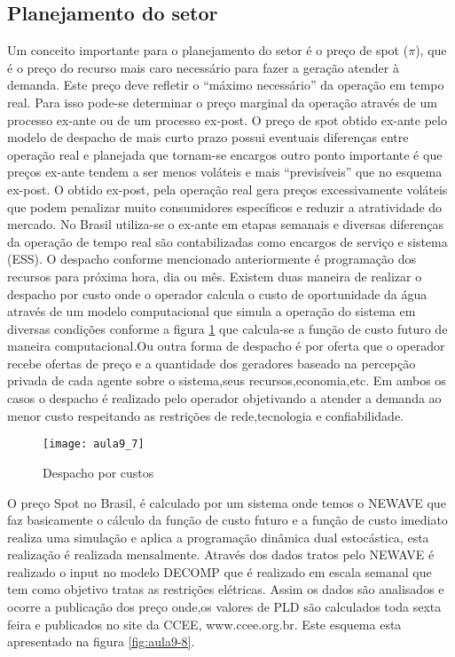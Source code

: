 \subsection{Planejamento do setor}
  Um conceito importante para o planejamento do setor é o preço de spot ($\pi$), que é o preço do recurso mais caro necessário para fazer a geração atender à demanda. Este preço deve refletir o ``máximo necessário'' da operação em tempo real. Para isso pode-se determinar o preço marginal da operação através de um processo ex-ante ou de um processo ex-post. O preço de spot obtido ex-ante pelo modelo de despacho de mais curto prazo possui eventuais diferenças entre operação real e planejada que tornam-se encargos outro ponto importante é que preços ex-ante tendem a ser menos voláteis e mais ``previsíveis'' que no esquema ex-post. O obtido ex-post, pela operação real gera preços excessivamente voláteis que podem penalizar muito consumidores específicos e reduzir a atratividade do mercado. No Brasil utiliza-se o ex-ante em etapas semanais e diversas diferenças da operação de tempo real são contabilizadas como encargos de serviço e sistema (ESS).
  O despacho conforme mencionado anteriormente é programação dos recursos para próxima hora, dia ou mês. Existem duas maneira de realizar o despacho por custo onde o operador calcula o custo de oportunidade da água através de um modelo computacional que simula a operação do sistema em diversas condições conforme a figura \ref{fig:aula9-7} que calcula-se a função de custo futuro de maneira computacional.Ou outra forma de despacho é por oferta que o operador recebe ofertas de preço e a quantidade dos geradores baseado
na percepção privada de cada agente sobre o sistema,seus recursos,economia,etc. Em ambos os casos o despacho é realizado pelo operador objetivando a atender a demanda ao menor custo 
respeitando as restrições de rede,tecnologia e confiabilidade.
\begin{figure}[H]
\begin{centering}
\texttt{[image: aula9\_7]}\protect\caption{\label{fig:aula9-7} Despacho por custos }
\end{centering}
\end{figure}
 O preço Spot no Brasil, é calculado por um sistema onde temos o NEWAVE que faz basicamente o cálculo da função de custo futuro e a função de custo imediato realiza uma simulação e aplica a programação dinâmica dual estocástica, esta realização é realizada mensalmente. Através dos dados tratos pelo NEWAVE é realizado o input no modelo DECOMP que é realizado em escala semanal que tem como objetivo tratas as restrições elétricas. Assim os dados são analisados e ocorre a publicação dos preço onde,os valores de PLD são calculados toda sexta feira e publicados no site da CCEE, www.ccee.org.br. Este esquema esta apresentado na figura \ref{fig:aula9-8}.

